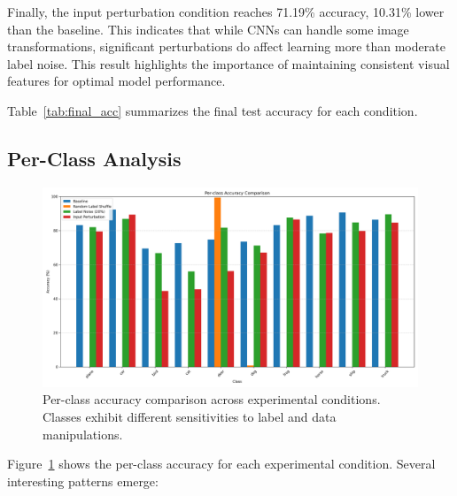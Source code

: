 \documentclass[10pt,twocolumn,letterpaper]{article}
\begin{document}
Finally, the input perturbation condition reaches 71.19\% accuracy, 10.31\% lower than the baseline.
This indicates that while CNNs can handle some image transformations, significant perturbations do affect learning more than moderate label noise.
This result highlights the importance of maintaining consistent visual features for optimal model performance.

Table~\ref{tab:final_acc} summarizes the final test accuracy for each condition.

\subsection{Per-Class Analysis}

\begin{figure}[t]
  \centering
  \includegraphics[width=0.9\linewidth]{results/per_class_comparison.png}
  \caption{Per-class accuracy comparison across experimental conditions. Classes exhibit different sensitivities to label and data manipulations.}
  \label{fig:per_class}
\end{figure}

Figure~\ref{fig:per_class} shows the per-class accuracy for each experimental condition.
Several interesting patterns emerge:
\end{document}
